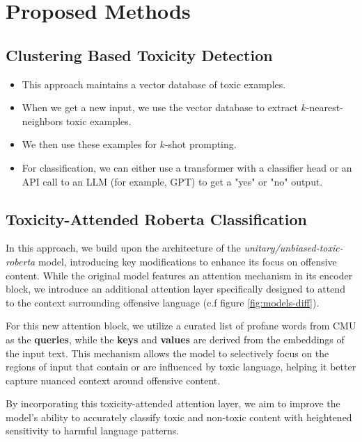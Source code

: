 \section{Proposed Methods}
\subsection{Clustering Based Toxicity Detection
}
\begin{itemize}
    \item This approach maintains a vector database of toxic examples.
    \item When we get a new input, we use the vector database to extract $k$-nearest-neighbors toxic examples.
    \item We then use these examples for $k$-shot prompting. 
    \item For classification, we can either use a transformer with a classifier head or an API call to an LLM (for example, GPT) to get a "yes" or "no" output.
\end{itemize}
\subsection{Toxicity-Attended Roberta Classification}
In this approach, we build upon the architecture of the \textit{unitary/unbiased-toxic-roberta} model, introducing key modifications to enhance its focus on offensive content. While the original model features an attention mechanism in its encoder block, we introduce an additional attention layer specifically designed to attend to the context surrounding offensive language (c.f figure \ref{fig:models-diff}).

For this new attention block, we utilize a curated list of profane words from CMU as the \textbf{queries}, while the \textbf{keys} and \textbf{values} are derived from the embeddings of the input text. This mechanism allows the model to selectively focus on the regions of input that contain or are influenced by toxic language, helping it better capture nuanced context around offensive content.

By incorporating this toxicity-attended attention layer, we aim to improve the model's ability to accurately classify toxic and non-toxic content with heightened sensitivity to harmful language patterns.

